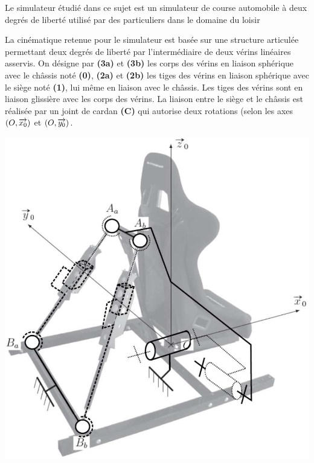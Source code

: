 \documentclass[10pt,fleqn]{article} %
\begin{document}
\def\pathfig{images}

\vspace{4.5cm}
\pagestyle{fancy}
\thispagestyle{plain}

\def\columnseprulecolor{\color{ocre}}
\setlength{\columnseprule}{0.4pt} 

\def\pathfig{images}

\ifprof
\else
\begin{multicols}{2}
\fi
Le simulateur étudié dans ce sujet est un simulateur de course automobile à deux degrés de
liberté utilisé par des particuliers dans le domaine du loisir

La cinématique retenue pour le simulateur est basée sur une structure articulée permettant
deux degrés de liberté par l’intermédiaire de deux vérins linéaires asservis. On désigne par \textbf{(3a)}
et \textbf{(3b)} les corps des vérins en liaison sphérique avec le châssis noté \textbf{(0)}, \textbf{(2a)} et \textbf{(2b)} les tiges
des vérins en liaison sphérique avec le siège noté \textbf{(1)}, lui même en liaison avec le châssis. Les
tiges des vérins sont en liaison glissière avec les corps des vérins. La liaison entre le siège et le
châssis est réalisée par un joint de cardan \textbf{(C)} qui autorise deux rotations (selon les axes $(O,\overrightarrow{x_0})$
et $(O,\overrightarrow{y_0})$.

\begin{center}
\includegraphics[width=.95\linewidth]{images/fig_02}
\end{center}


\end{multicols}
\end{document}
